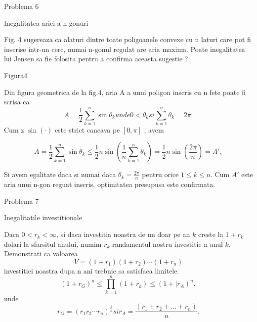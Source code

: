 \documentclass[a4paper,12pt,oneside]{report}
\begin{document}
Problema 6 

Inegalitatea ariei a n-gonuri

Fig. 4 sugereaza ca alaturi dintre toate poligoanele convexe cu n laturi care pot fi inscrise intr-un cerc, numai n-gonul regulat are aria maxima. Poate inegalitatea lui Jensen sa fie folosita pentru a confirma aceasta sugestie ?

Figura4

Din figura geometrica de la fig.4, aria A a unui poligon inscris cu n fete poate fi scrisa ca 
\begin{displaymath}
  A = \frac{1}{2}\sum_{k = 1}^{n} \sin \theta _{k} unde 0< \theta _{k} si \sum_{k = 1}^n{\theta _{k}} = 2\pi. 
\end{displaymath}
	Cum z \(\sin \left ( \cdot  \right )\) este strict cancava pe \(\left [ 0 , \pi  \right ]\) , avem 

\begin{displaymath}
  A = \frac{1}{2}\sum_{k = 1}^{n} \sin \theta _{k}  \leq \frac{1}{2}n\sin\left ( \frac{1}{n}\sum_{k = 1}^{n}\theta _{k} \right ) = \frac{1}{2}n\sin \left ( \frac{2\pi }{n} \right ) = {A}',
\end{displaymath}

Si avem egalitate daca si numai daca \(\theta _{k} = \frac{2\pi }{n}\) pentru orice \(1\leq k\leq n\). Cum \({A}'\) este aria unui n-gon reguat inscris, optimitatea presupusa este confirmata. 


Problema 7

Inegalitatile investitionale 

Daca \(0< r_{k} < \infty\), si daca investitia noastra de un doar pe an \(k\) creste la \(1 +  r_{k}\) dolari la sfarsitul anului, numim \(r_{k}\) randamentul nostru investitie n anul \(k\). Demonstrati ca valoarea 
\begin{displaymath}
  V = \left ( 1 + r_{1} \right )\left ( 1 + r_{2} \right )\cdots \left ( 1 + r_{n} \right )
\end{displaymath} 
investitiei noastra dupa n ani trebuie sa satisfaca limitele. 
\begin{displaymath}
  \left ( 1 + r_{G} \right )^{n} \leq \prod_{k = 1}^{n} \left ( 1 + r_{k} \right )\leq \left ( 1 + |r_{A} \right )^{n}, \label{eq:2.13} \tag{2.13}
\end{displaymath}
unde 
\begin{displaymath}
  r_{G} = \left ( r_{1}r_{2} \cdots r_{n}\right )^{\frac{1}{n}} si r_{A} = \frac{\left ( r_{1} + r_{2} +  ...+ r_{n}\right )}{n} .
\end{displaymath}
\end{document}
